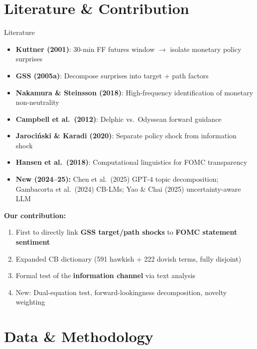 \documentclass[aspectratio=169, 11pt]{beamer}
\begin{document}
\section{Literature \& Contribution}

\begin{frame}{Literature}
\begin{itemize}
  \item \textbf{Kuttner (2001)}: 30-min FF futures window $\rightarrow$ isolate monetary policy surprises
  \item \textbf{GSS (2005a)}: Decompose surprises into \textcolor{accent}{target} + \textcolor{alertc}{path} factors
  \item \textbf{Nakamura \& Steinsson (2018)}: High-frequency identification of monetary non-neutrality
  \item \textbf{Campbell et al.\ (2012)}: Delphic vs.\ Odyssean forward guidance
  \item \textbf{Jaroci\'{n}ski \& Karadi (2020)}: Separate policy shock from information shock
  \item \textbf{Hansen et al.\ (2018)}: Computational linguistics for FOMC transparency
  \item \textcolor{success}{\textbf{New (2024--25):}} Chen et al.\ (2025) GPT-4 topic decomposition; Gambacorta et al.\ (2024) CB-LMs; Yao \& Chai (2025) uncertainty-aware LLM
\end{itemize}

\vspace{0.5em}
\textbf{Our contribution:}
\begin{enumerate}
  \item First to directly link \textbf{GSS target/path shocks} to \textbf{FOMC statement sentiment}
  \item Expanded CB dictionary (591 hawkish + 222 dovish terms, fully disjoint)
  \item Formal test of the \textbf{information channel} via text analysis
  \item \textcolor{success}{New:} Dual-equation test, forward-lookingness decomposition, novelty weighting
\end{enumerate}
\end{frame}

\section{Data \& Methodology}
\end{document}
